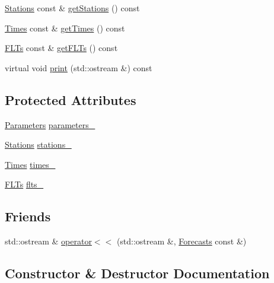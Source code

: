 \begin{DoxyCompactItemize}
\item 
\mbox{\hyperlink{class_stations}{Stations}} const  \& \mbox{\hyperlink{class_forecasts_a3db4c9546c88683586b606500a5e3c22}{get\+Stations}} () const
\item 
\mbox{\hyperlink{class_times}{Times}} const  \& \mbox{\hyperlink{class_forecasts_a269d0121cfb01a9f3299df572c7f83be}{get\+Times}} () const
\item 
\mbox{\hyperlink{class_f_l_ts}{F\+L\+Ts}} const  \& \mbox{\hyperlink{class_forecasts_aa791d0794da8090a572764665d43180f}{get\+F\+L\+Ts}} () const
\item 
virtual void \mbox{\hyperlink{class_forecasts_addb1f75f0dc6833c466453c51256812c}{print}} (std\+::ostream \&) const
\end{DoxyCompactItemize}
\subsection*{Protected Attributes}
\begin{DoxyCompactItemize}
\item 
\mbox{\hyperlink{class_parameters}{Parameters}} \mbox{\hyperlink{class_forecasts_a3705673d34a2f6468659955fb3d28abb}{parameters\+\_\+}}
\item 
\mbox{\hyperlink{class_stations}{Stations}} \mbox{\hyperlink{class_forecasts_a5557d3b6c0700d6da88d2610f95287ab}{stations\+\_\+}}
\item 
\mbox{\hyperlink{class_times}{Times}} \mbox{\hyperlink{class_forecasts_abe5747fb6460d05937ab95ff3b7f8b3f}{times\+\_\+}}
\item 
\mbox{\hyperlink{class_f_l_ts}{F\+L\+Ts}} \mbox{\hyperlink{class_forecasts_a5bbcb6eb5d291718f8f91e576827518b}{flts\+\_\+}}
\end{DoxyCompactItemize}
\subsection*{Friends}
\begin{DoxyCompactItemize}
\item 
std\+::ostream \& \mbox{\hyperlink{class_forecasts_a42c14120042eae287169092654f5b6c8}{operator$<$$<$}} (std\+::ostream \&, \mbox{\hyperlink{class_forecasts}{Forecasts}} const \&)
\end{DoxyCompactItemize}


\subsection{Constructor \& Destructor Documentation}
\mbox{\label{class_forecasts_a0e602a4bb37b4d6092f475da8c20ed27}} 
